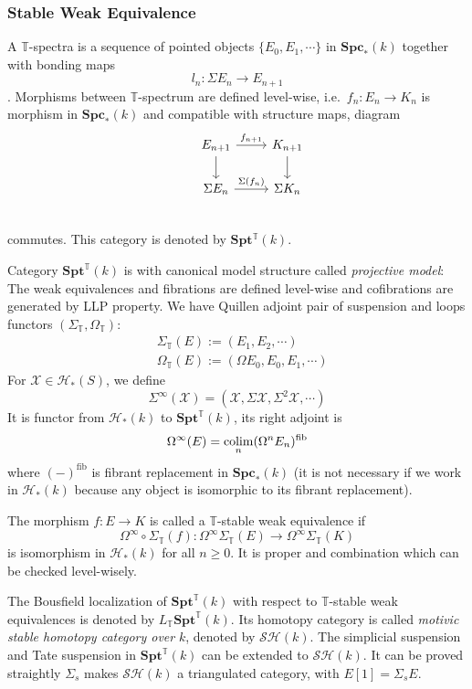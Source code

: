 \documentclass[b5paper,10pt]{article}
\begin{document}
\subsubsection{Stable Weak Equivalence}
\begin{secdefn}
	A $\mathbb{T}$-spectra is a sequence of pointed objects $\{ E_0, E_1 ,\cdots\}$ in $\mathbf{Spc}_*(k)$ together with bonding maps
	\[
	l_n \colon \Sigma E_{n} \to  E_{n+1}
	\].	
	Morphisms between $\mathbb{T}$-spectrum are defined level-wise, i.e.\ $f_n \colon E_n \to K_n$ is morphism in $\mathbf{Spc}_*(k)$ and compatible with structure maps, diagram
	\[
	\begin{tikzcd}
	&E_{n+1} \ar[r,"f_{n+1}"] \ar[d]& K_{n+1} \ar[d]\\
	&\Sigma E_{n} \ar[r,"\Sigma (f_{n})"] & \Sigma K_{n}\\
	\end{tikzcd}
	\]
	commutes.
	 This category is denoted by $\mathbf{Spt^{\mathbb{T}}}(k)$.
\end{secdefn}
Category $\mathbf{Spt^{\mathbb{T}}}(k)$ is with canonical model structure called \emph{projective model}: The weak equivalences and fibrations are defined level-wise and cofibrations are generated by LLP property. We have Quillen adjoint pair of suspension and loops functors $(\Sigma_\mathbb{T}, \Omega_\mathbb{T})$:
\[
\begin{aligned}
&\Sigma_\mathbb{T}(E) := (E_1, E_2 ,\cdots)\\
&\Omega_{\mathbb{T}}(E) := (\Omega E_0, E_0, E_1,\cdots)
\end{aligned}
\]
For $\mathcal{X} \in \mathcal{H}_*(S)$, we define
\[
\Sigma^{\infty}(\mathcal{X}) = (\mathcal{X} , \Sigma \mathcal{X}, \Sigma^2 \mathcal{X}, \cdots)\]
It is functor from $\mathcal{H}_*(k)$ to $\mathbf{Spt}^{\mathbb{T}}(k)$, its right adjoint is 
\[
\Omega^{\infty}(E)= \operatorname*{colim}_n( \Omega^n E_n)^{\text{fib}}
\]
where $(-)^{\text{fib}}$ is fibrant replacement in $\mathbf{Spc}_*(k)$ (it is not necessary if we work in $\mathcal{H}_*(k) $ because any object is isomorphic to its fibrant replacement).
\begin{secdefn}
	The morphism $f \colon E \to K$ is called a $\mathbb{T}$-stable weak equivalence if 
	\[
	\Omega^{\infty}\circ \Sigma_{\mathbb{T}} (f) \colon \Omega^{\infty} \Sigma_{\mathbb{T}}(E) \to \Omega^{\infty} \Sigma_{\mathbb{T}}(K)
	\]
	is isomorphism in $\mathcal{H}_*(k)$ for all $n \geq 0$. It is proper and combination which can be checked level-wisely.
\end{secdefn}
The Bousfield localization of $\mathbf{Spt}^{\mathbb{T}}(k)$ with respect to $\mathbb{T}$-stable weak equivalences is denoted by $L_\mathbb{T} \mathbf{Spt }^{\mathbb{T}}(k)$. Its homotopy category is called \emph{motivic stable homotopy category over} $k$, denoted by $\mathcal{SH}(k)$. The simplicial suspension and Tate suspension in $\mathbf{Spt}^{\mathbb{T}}(k)$ can be extended to $\mathcal{SH}(k)$. It can be proved straightly $\Sigma_s$ makes $\mathcal{SH}(k)$ a triangulated category, with $E[1]= \Sigma_s E$.
\end{document}
